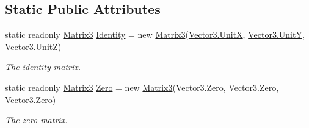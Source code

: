 \subsection*{Static Public Attributes}
\begin{DoxyCompactItemize}
\item 
static readonly \hyperlink{struct_open_t_k_1_1_matrix3}{Matrix3} \hyperlink{struct_open_t_k_1_1_matrix3_aa9992c5ab11d1f28c02df478c06071bf}{Identity} = new \hyperlink{struct_open_t_k_1_1_matrix3}{Matrix3}(\hyperlink{struct_open_t_k_1_1_vector3_a54bca41090c546209620c5cbad1f0a40}{Vector3.\-Unit\-X}, \hyperlink{struct_open_t_k_1_1_vector3_acbc98b807526c6eecc9fc75e9a819db5}{Vector3.\-Unit\-Y}, \hyperlink{struct_open_t_k_1_1_vector3_acc3b909cd51e4989e798052ed5c5d327}{Vector3.\-Unit\-Z})
\begin{DoxyCompactList}\small\item\em The identity matrix. \end{DoxyCompactList}\item 
static readonly \hyperlink{struct_open_t_k_1_1_matrix3}{Matrix3} \hyperlink{struct_open_t_k_1_1_matrix3_a489c0a09a7421745801996dff0fd490b}{Zero} = new \hyperlink{struct_open_t_k_1_1_matrix3}{Matrix3}(Vector3.\-Zero, Vector3.\-Zero, Vector3.\-Zero)
\begin{DoxyCompactList}\small\item\em The zero matrix. \end{DoxyCompactList}\end{DoxyCompactItemize}

